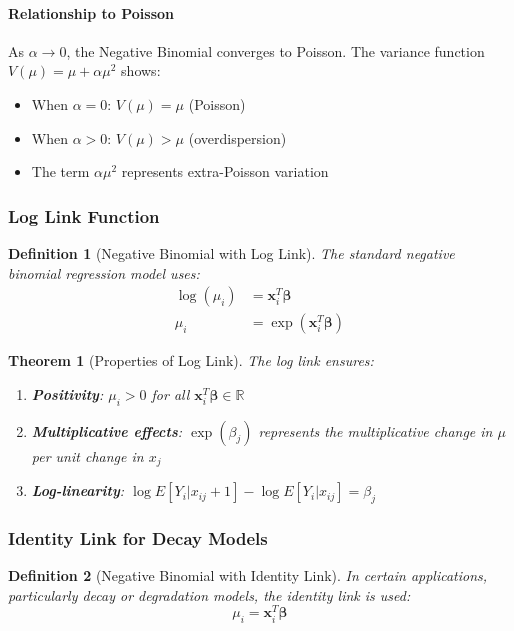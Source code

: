 \documentclass{article}
\newtheorem{definition}{Definition}
\newtheorem{theorem}{Theorem}
\begin{document}
\paragraph{Relationship to Poisson}
As $\alpha \to 0$, the Negative Binomial converges to Poisson. The variance function $V(\mu) = \mu + \alpha\mu^2$ shows:
\begin{itemize}
    \item When $\alpha = 0$: $V(\mu) = \mu$ (Poisson)
    \item When $\alpha > 0$: $V(\mu) > \mu$ (overdispersion)
    \item The term $\alpha\mu^2$ represents extra-Poisson variation
\end{itemize}

\subsubsection{Log Link Function}

\begin{definition}[Negative Binomial with Log Link]
The standard negative binomial regression model uses:
\begin{align}
\log(\mu_i) &= \mathbf{x}_i^T\boldsymbol{\beta} \\
\mu_i &= \exp(\mathbf{x}_i^T\boldsymbol{\beta})
\end{align}
\end{definition}

\begin{theorem}[Properties of Log Link]
The log link ensures:
\begin{enumerate}
    \item \textbf{Positivity}: $\mu_i > 0$ for all $\mathbf{x}_i^T\boldsymbol{\beta} \in \mathbb{R}$
    \item \textbf{Multiplicative effects}: $\exp(\beta_j)$ represents the multiplicative change in $\mu$ per unit change in $x_j$
    \item \textbf{Log-linearity}: $\log E[Y_i|x_{ij} + 1] - \log E[Y_i|x_{ij}] = \beta_j$
\end{enumerate}
\end{theorem}

\subsubsection{Identity Link for Decay Models}

\begin{definition}[Negative Binomial with Identity Link]
In certain applications, particularly decay or degradation models, the identity link is used:
\begin{equation}
\mu_i = \mathbf{x}_i^T\boldsymbol{\beta}
\end{equation}
\end{definition}
\end{document}

